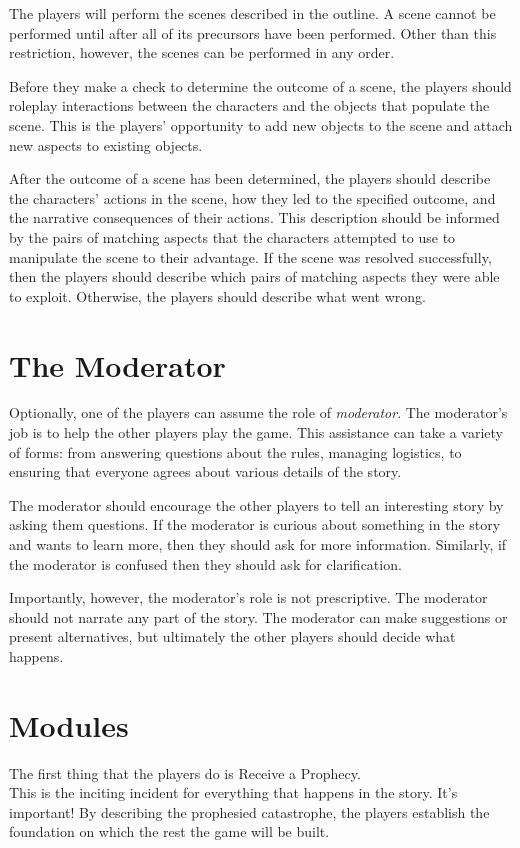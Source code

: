 \documentclass[12pt, a5paper, parskip=half-]{scrartcl}
\begin{document}
The players will perform the scenes described in the outline.
A scene cannot be performed until after all of its precursors have been performed. Other than this restriction, however, the scenes can be performed in any order.

Before they make a check to determine the outcome of a scene, the players should roleplay interactions between the characters and the objects that populate the scene.
This is the players' opportunity to add new objects to the scene and attach new aspects to existing objects.

After the outcome of a scene has been determined, the players should describe the characters' actions in the scene, how they led to the specified outcome, and the narrative consequences of their actions.
This description should be informed by the pairs of matching aspects that the characters attempted to use to manipulate the scene to their advantage.
If the scene was resolved successfully, then the players should describe which pairs of matching aspects they were able to exploit.
Otherwise, the players should describe what went wrong.

\newpage

\section*{The Moderator}
Optionally, one of the players can assume the role of \emph{moderator}. The moderator's job is to help the other players play the game. This assistance can take a variety of forms: from answering questions about the rules, managing logistics, to ensuring that everyone agrees about various details of the story.

The moderator should encourage the other players to tell an interesting story by asking them questions.  If the moderator is curious about something in the story and wants to learn more, then they should ask for more information.  Similarly, if the moderator is confused then they should ask for clarification.

Importantly, however, the moderator's role is not prescriptive.  The moderator should not narrate any part of the story. The moderator can make suggestions or present alternatives, but ultimately the other players should decide what happens.

\newpage

\section*{Modules}
The first thing that the players do is {\cinzel \small Receive a Prophecy}.  \\
This is the inciting incident for everything that happens in the story.
It's important!
By describing the prophesied catastrophe, the players establish the foundation on which the rest the game will be built.
\end{document}
